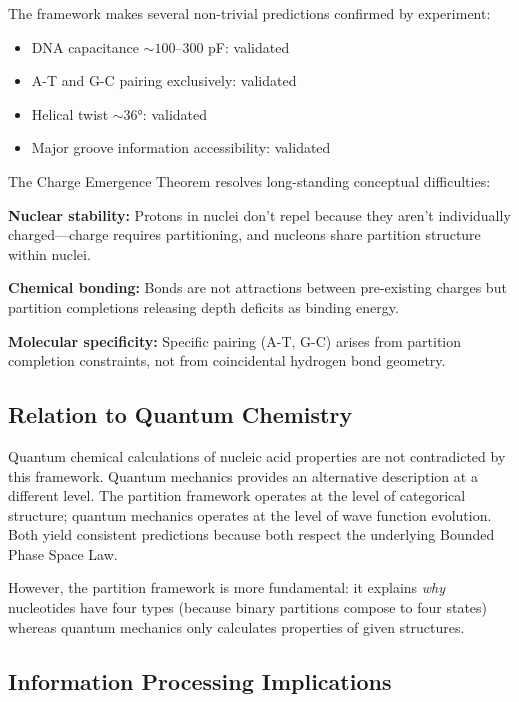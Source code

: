 \documentclass[twocolumn,10pt,a4paper]{article}
\theoremstyle{definition}
\theoremstyle{remark}
\begin{document}
The framework makes several non-trivial predictions confirmed by experiment:
\begin{itemize}
    \item DNA capacitance $\sim 100$--$300$ pF: validated \cite{kornyshev2007}
    \item A-T and G-C pairing exclusively: validated \cite{watson1953}
    \item Helical twist $\sim 36°$: validated \cite{franklin1953}
    \item Major groove information accessibility: validated \cite{seeman1976}
\end{itemize}

The Charge Emergence Theorem resolves long-standing conceptual difficulties:

\textbf{Nuclear stability:} Protons in nuclei don't repel because they aren't individually charged---charge requires partitioning, and nucleons share partition structure within nuclei.

\textbf{Chemical bonding:} Bonds are not attractions between pre-existing charges but partition completions releasing depth deficits as binding energy.

\textbf{Molecular specificity:} Specific pairing (A-T, G-C) arises from partition completion constraints, not from coincidental hydrogen bond geometry.

\subsection{Relation to Quantum Chemistry}

Quantum chemical calculations of nucleic acid properties \cite{sponer2006} are not contradicted by this framework. Quantum mechanics provides an alternative description at a different level. The partition framework operates at the level of categorical structure; quantum mechanics operates at the level of wave function evolution. Both yield consistent predictions because both respect the underlying Bounded Phase Space Law.

However, the partition framework is more fundamental: it explains \emph{why} nucleotides have four types (because binary partitions compose to four states) whereas quantum mechanics only calculates properties of given structures.

\subsection{Information Processing Implications}
\end{document}
